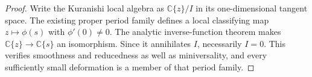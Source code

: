 \begin{proof}
Write the Kuranishi local algebra as $\mathbb C\{z\}/I$ in its
one-dimensional tangent space. The existing proper period family
defines a local classifying map $z\mapsto\phi(s)$ with
$\phi'(0)\ne0$. The analytic inverse-function theorem makes
$\mathbb C\{z\}\to\mathbb C\{s\}$ an isomorphism. Since it
annihilates $I$, necessarily $I=0$. This verifies smoothness and
reducedness as well as miniversality, and every sufficiently small
deformation is a member of that period family.
\end{proof}